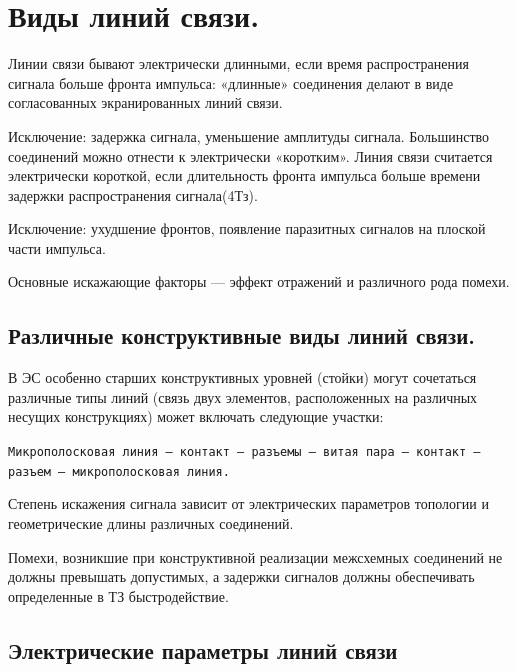 \documentclass[unicode, 12pt, a4paper, oneside]{article}
\begin{document}
\section{Виды линий связи.}

Линии связи бывают электрически длинными, если время распространения сигнала больше фронта импульса: «длинные» соединения делают в виде согласованных экранированных линий связи.

Исключение: задержка сигнала, уменьшение амплитуды сигнала. Большинство соединений можно отнести к электрически «коротким». Линия связи считается электрически короткой, если длительность фронта импульса больше времени задержки распространения сигнала(4Тз).

Исключение: ухудшение фронтов, появление паразитных сигналов на плоской части импульса.

Основные искажающие факторы --- эффект отражений и различного рода помехи.

\subsection*{Различные конструктивные виды линий связи.}

В ЭС особенно старших конструктивных уровней (стойки) могут сочетаться различные типы линий (связь двух элементов, расположенных на различных несущих конструкциях) может включать следующие участки:

\texttt{Микрополосковая линия -- контакт -- разъемы -- витая пара -- контакт -- разъем -- микрополосковая линия.}

Степень искажения сигнала зависит от электрических параметров топологии и геометрические длины различных соединений.

Помехи, возникшие при конструктивной реализации межсхемных соединений не должны превышать допустимых, а задержки сигналов должны обеспечивать определенные в ТЗ быстродействие.

\subsection*{Электрические параметры линий связи}
\end{document}
